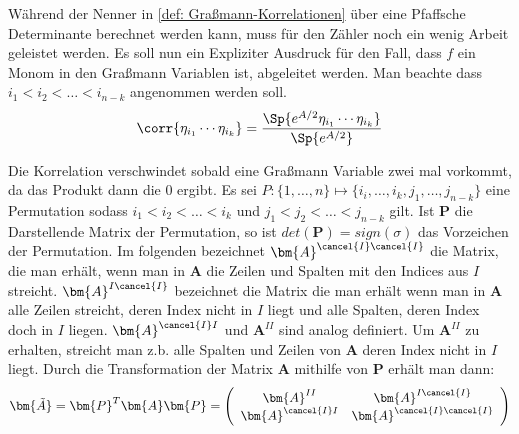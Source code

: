 \noindent Während der Nenner in \eqref{def: Graßmann-Korrelationen} über eine Pfaffsche Determinante berechnet werden kann, muss für den Zähler noch ein wenig Arbeit geleistet werden. Es soll nun ein Expliziter Ausdruck für den Fall, dass $f$ ein Monom in den Graßmann Variablen ist, abgeleitet werden. Man beachte dass $i_1 < i_2 < \dots < i_{n-k}$ angenommen werden soll.
\begin{equation} \label{def: Graßmann-Korrelationen monom}
\corr{\eta_{i_1} \cdots \eta_{i_k}} = \frac{\Sp{e^{A/2}\eta_{i_1} \cdots \eta_{i_k}}}{\Sp{e^{A/2}}} 
\end{equation}

\noindent Die Korrelation verschwindet sobald eine Graßmann Variable zwei mal vorkommt, da das Produkt dann die 0 ergibt. Es sei $P: \{1,\dots, n\} \mapsto \{i_i, \dots, i_k, j_1, \dots, j_{n-k}\}$ eine Permutation sodass $i_1 < i_2 < \dots < i_{k}$ und $j_1 < j_2 < \dots < j_{n-k}$ gilt. Ist $\bm{P}$ die Darstellende Matrix der Permutation, so ist $det(\bm{P}) = sign(\sigma)$ das Vorzeichen der Permutation. Im folgenden bezeichnet $\bm{A}^{\cancel{I}\cancel{I}}$ die Matrix, die man erhält, wenn man in $\bm{A}$ die Zeilen und Spalten mit den Indices aus $I$ streicht. $\bm{A}^{I \cancel{I}}$ bezeichnet die Matrix die man erhält wenn man in $\bm{A}$ alle Zeilen streicht, deren Index nicht in $I$ liegt und alle Spalten, deren Index doch in $I$ liegen. $\bm{A}^{\cancel{I} I}$ und $\bm{A}^{II}$ sind analog definiert. Um $\bm{A}^{II}$ zu erhalten, streicht man z.b. alle Spalten und Zeilen von $\bm{A}$ deren Index nicht in $I$ liegt.
Durch die Transformation der Matrix $\bm{A}$ mithilfe von $\bm{P}$ erhält man dann:
\begin{equation}
   \bm{\tilde{A}} =  \bm{P}^T \bm{A} \bm{P} =
        \left( \begin{array}{cc}
        \bm{A}^{II}          & \bm{A}^{I \cancel{I}} \\
        \bm{A}^{\cancel{I} I} & \bm{A}^{\cancel{I} \cancel{I}}
        \end{array} \right)
\end{equation}

